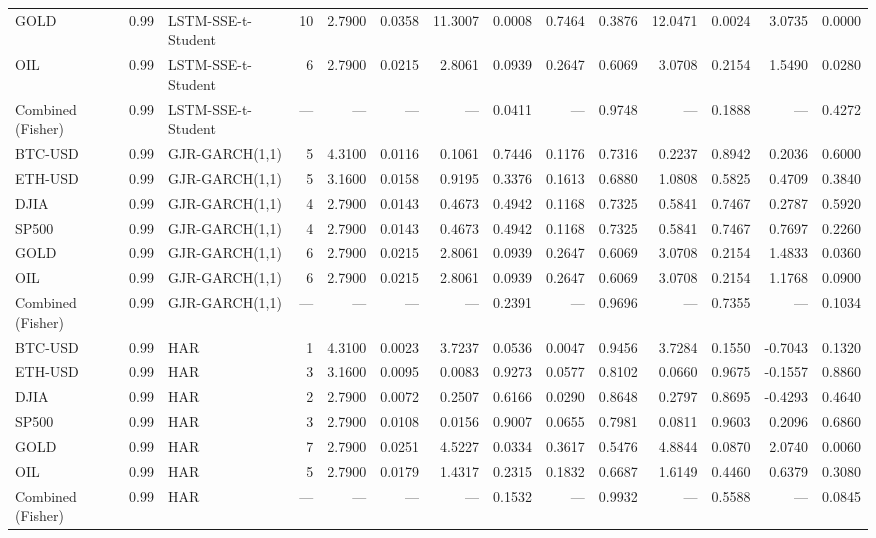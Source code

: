 \begin{table}[ht]
\begin{tabular}{lllrrrrrrrrrrr}
GOLD & 0.99 & LSTM-SSE-t-Student & 10 & 2.7900 & 0.0358 & 11.3007 & 0.0008 & 0.7464 & 0.3876 & 12.0471 & 0.0024 & 3.0735 & 0.0000 \\
OIL & 0.99 & LSTM-SSE-t-Student & 6 & 2.7900 & 0.0215 & 2.8061 & 0.0939 & 0.2647 & 0.6069 & 3.0708 & 0.2154 & 1.5490 & 0.0280 \\
Combined (Fisher) & 0.99 & LSTM-SSE-t-Student & — & — & — & — & 0.0411 & — & 0.9748 & — & 0.1888 & — & 0.4272 \\
BTC-USD & 0.99 & GJR-GARCH(1,1) & 5 & 4.3100 & 0.0116 & 0.1061 & 0.7446 & 0.1176 & 0.7316 & 0.2237 & 0.8942 & 0.2036 & 0.6000 \\
ETH-USD & 0.99 & GJR-GARCH(1,1) & 5 & 3.1600 & 0.0158 & 0.9195 & 0.3376 & 0.1613 & 0.6880 & 1.0808 & 0.5825 & 0.4709 & 0.3840 \\
DJIA & 0.99 & GJR-GARCH(1,1) & 4 & 2.7900 & 0.0143 & 0.4673 & 0.4942 & 0.1168 & 0.7325 & 0.5841 & 0.7467 & 0.2787 & 0.5920 \\
SP500 & 0.99 & GJR-GARCH(1,1) & 4 & 2.7900 & 0.0143 & 0.4673 & 0.4942 & 0.1168 & 0.7325 & 0.5841 & 0.7467 & 0.7697 & 0.2260 \\
GOLD & 0.99 & GJR-GARCH(1,1) & 6 & 2.7900 & 0.0215 & 2.8061 & 0.0939 & 0.2647 & 0.6069 & 3.0708 & 0.2154 & 1.4833 & 0.0360 \\
OIL & 0.99 & GJR-GARCH(1,1) & 6 & 2.7900 & 0.0215 & 2.8061 & 0.0939 & 0.2647 & 0.6069 & 3.0708 & 0.2154 & 1.1768 & 0.0900 \\
Combined (Fisher) & 0.99 & GJR-GARCH(1,1) & — & — & — & — & 0.2391 & — & 0.9696 & — & 0.7355 & — & 0.1034 \\
BTC-USD & 0.99 & HAR & 1 & 4.3100 & 0.0023 & 3.7237 & 0.0536 & 0.0047 & 0.9456 & 3.7284 & 0.1550 & -0.7043 & 0.1320 \\
ETH-USD & 0.99 & HAR & 3 & 3.1600 & 0.0095 & 0.0083 & 0.9273 & 0.0577 & 0.8102 & 0.0660 & 0.9675 & -0.1557 & 0.8860 \\
DJIA & 0.99 & HAR & 2 & 2.7900 & 0.0072 & 0.2507 & 0.6166 & 0.0290 & 0.8648 & 0.2797 & 0.8695 & -0.4293 & 0.4640 \\
SP500 & 0.99 & HAR & 3 & 2.7900 & 0.0108 & 0.0156 & 0.9007 & 0.0655 & 0.7981 & 0.0811 & 0.9603 & 0.2096 & 0.6860 \\
GOLD & 0.99 & HAR & 7 & 2.7900 & 0.0251 & 4.5227 & 0.0334 & 0.3617 & 0.5476 & 4.8844 & 0.0870 & 2.0740 & 0.0060 \\
OIL & 0.99 & HAR & 5 & 2.7900 & 0.0179 & 1.4317 & 0.2315 & 0.1832 & 0.6687 & 1.6149 & 0.4460 & 0.6379 & 0.3080 \\
Combined (Fisher) & 0.99 & HAR & — & — & — & — & 0.1532 & — & 0.9932 & — & 0.5588 & — & 0.0845 \\

\end{tabular}
\end{table}
